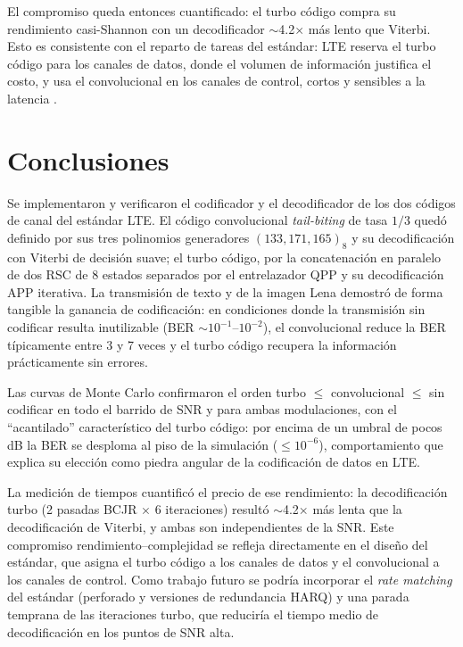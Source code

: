 \documentclass[conference,onecolumn]{IEEEtran}
\begin{document}
El compromiso queda entonces cuantificado: el turbo código compra su rendimiento
casi-Shannon con un decodificador $\sim$4.2$\times$ más lento que Viterbi. Esto es
consistente con el reparto de tareas del estándar: LTE reserva el turbo código para los canales
de datos, donde el volumen de información justifica el costo, y usa el convolucional en los
canales de control, cortos y sensibles a la latencia \cite{dahlman2014}.

\section{Conclusiones}

Se implementaron y verificaron el codificador y el decodificador de los dos códigos de canal del
estándar LTE. El código convolucional \textit{tail-biting} de tasa $1/3$ quedó definido por sus
tres polinomios generadores $(133,171,165)_8$ y su decodificación con Viterbi de decisión suave;
el turbo código, por la concatenación en paralelo de dos RSC de 8 estados separados por el
entrelazador QPP y su decodificación APP iterativa. La transmisión de texto y de la imagen Lena
demostró de forma tangible la ganancia de codificación: en condiciones donde la transmisión sin
codificar resulta inutilizable (BER $\sim10^{-1}$--$10^{-2}$), el convolucional reduce la BER
típicamente entre 3 y 7 veces y el turbo código recupera la información prácticamente sin errores.

Las curvas de Monte Carlo confirmaron el orden turbo $\leq$ convolucional $\leq$ sin codificar en
todo el barrido de SNR y para ambas modulaciones, con el ``acantilado'' característico del turbo
código: por encima de un umbral de pocos dB la BER se desploma al piso de la simulación
($\le 10^{-6}$), comportamiento que explica su elección como piedra angular de la codificación de
datos en LTE.

La medición de tiempos cuantificó el precio de ese rendimiento: la decodificación turbo
(2 pasadas BCJR $\times$ 6 iteraciones) resultó $\sim$4.2$\times$ más lenta que la
decodificación de Viterbi, y ambas son independientes de la SNR. Este compromiso
rendimiento--complejidad se refleja directamente en el diseño del estándar, que asigna el turbo
código a los canales de datos y el convolucional a los canales de control. Como trabajo futuro se
podría incorporar el \textit{rate matching} del estándar (perforado y versiones de redundancia
HARQ) y una parada temprana de las iteraciones turbo, que reduciría el tiempo medio de
decodificación en los puntos de SNR alta.




\end{document}
